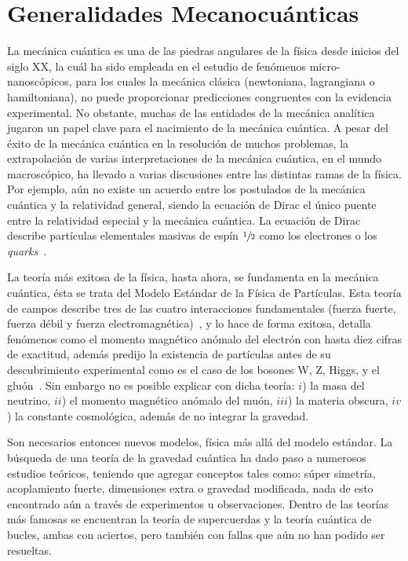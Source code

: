 \section{Generalidades Mecanocuánticas}

La mecánica cuántica es una de las piedras angulares de la física desde inicios
del siglo XX, la cuál ha sido empleada en el estudio de fenómenos micro-
nanoscópicos, para los cuales la mecánica clásica (newtoniana, lagrangiana o
hamiltoniana), no puede proporcionar predicciones congruentes con la evidencia
experimental. No obstante, muchas de las entidades de la mecánica analítica
jugaron un papel clave para el nacimiento de la mecánica cuántica. A pesar del
éxito de la mecánica cuántica en la resolución de muchos problemas, la
extrapolación de varias interpretaciones de la mecánica cuántica, en el mundo
macroscópico, ha llevado a varias discusiones entre las distintas ramas de la
física. Por ejemplo, aún no existe un acuerdo entre los postulados de la
mecánica cuántica y la relatividad general, siendo la ecuación de Dirac el
único puente entre la relatividad especial y la mecánica cuántica. La ecuación
de Dirac describe partículas elementales masivas de espín $\sfrac{1}{2}$ como
los electrones o los \textit{quarks}~\cite{Halzen1984}.

La teoría más exitosa de la física, hasta ahora, se fundamenta en la mecánica
cuántica, ésta se trata del Modelo Estándar de la Física de Partículas. Esta
teoría de campos describe tres de las cuatro interacciones fundamentales
(fuerza fuerte, fuerza débil y fuerza electromagnética)~\cite{Cheng1984}, y lo
hace de forma exitosa, detalla fenómenos como el momento magnético anómalo del
electrón con hasta diez cifras de exactitud, además predijo la existencia de
partículas antes de su descubrimiento experimental como es el caso de los
bosones W, Z, Higgs, y el gluón~\cite{Kinoshita2006}.  Sin embargo no es
posible explicar con dicha teoría: $i$) la masa del neutrino, $ii$) el momento
magnético anómalo del muón, $iii$) la materia obscura, $iv$) la constante
cosmológica, además de no integrar la gravedad.

Son necesarios entonces nuevos modelos, física más allá del modelo estándar.
La búsqueda de una teoría de la gravedad cuántica ha dado paso a numerosos
estudios teóricos, teniendo que agregar conceptos tales como: súper simetría,
acoplamiento fuerte, dimensiones extra o gravedad modificada, nada de esto
encontrado aún a través de experimentos u observaciones.  Dentro de las teorías
más famosas se encuentran la teoría de supercuerdas y la teoría cuántica de
bucles, ambas con aciertos, pero también con fallas que aún no han podido ser
resueltas.

